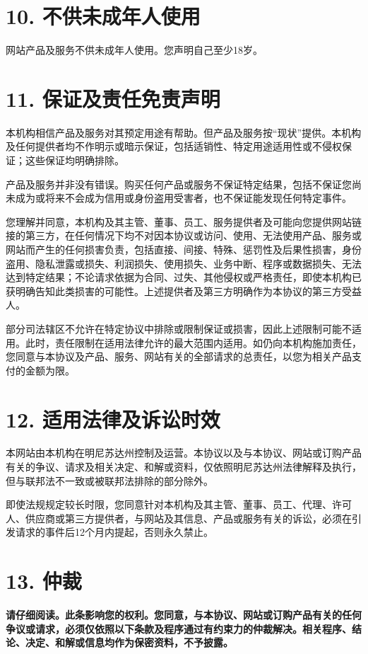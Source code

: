 \documentclass[UTF8,fontset=none,11pt,a4paper]{ctexart}
\begin{document}
\section*{10. 不供未成年人使用}
网站产品及服务不供未成年人使用。您声明自己至少18岁。


\section*{11. 保证及责任免责声明}
本机构相信产品及服务对其预定用途有帮助。但产品及服务按“现状”提供。本机构及任何提供者均不作明示或暗示保证，包括适销性、特定用途适用性或不侵权保证；这些保证均明确排除。


产品及服务并非没有错误。购买任何产品或服务不保证特定结果，包括不保证您尚未成为或将来不会成为信用或身份盗用受害者，也不保证能发现任何特定事件。


您理解并同意，本机构及其主管、董事、员工、服务提供者及可能向您提供网站链接的第三方，在任何情况下均不对因本协议或访问、使用、无法使用产品、服务或网站而产生的任何损害负责，包括直接、间接、特殊、惩罚性及后果性损害，身份盗用、隐私泄露或损失、利润损失、使用损失、业务中断、程序或数据损失、无法达到特定结果；不论请求依据为合同、过失、其他侵权或严格责任，即使本机构已获明确告知此类损害的可能性。上述提供者及第三方明确作为本协议的第三方受益人。


部分司法辖区不允许在特定协议中排除或限制保证或损害，因此上述限制可能不适用。此时，责任限制在适用法律允许的最大范围内适用。如仍向本机构施加责任，您同意与本协议及产品、服务、网站有关的全部请求的总责任，以您为相关产品支付的金额为限。


\section*{12. 适用法律及诉讼时效}
本网站由本机构在明尼苏达州控制及运营。本协议以及与本协议、网站或订购产品有关的争议、请求及相关决定、和解或资料，仅依照明尼苏达州法律解释及执行，但与联邦法不一致或被联邦法排除的部分除外。


即使法规规定较长时限，您同意针对本机构及其主管、董事、员工、代理、许可人、供应商或第三方提供者，与网站及其信息、产品或服务有关的诉讼，必须在引发请求的事件后12个月内提起，否则永久禁止。


\section*{13. 仲裁}
\textbf{请仔细阅读。此条影响您的权利。您同意，与本协议、网站或订购产品有关的任何争议或请求，必须仅依照以下条款及程序通过有约束力的仲裁解决。相关程序、结论、决定、和解或信息均作为保密资料，不予披露。}
\end{document}
